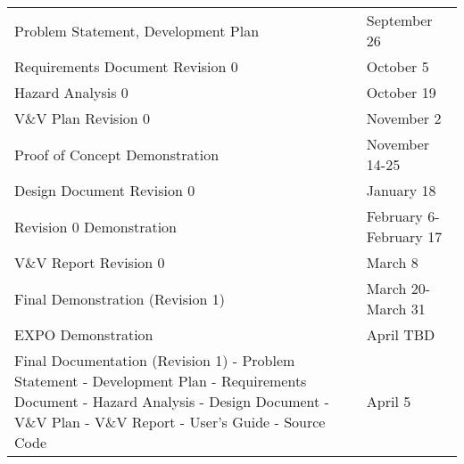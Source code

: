 \documentclass{article}
\begin{document}
\noindent \begin{tabular}{ p{6.7cm} l}
   Problem Statement, Development Plan & September 26 \\
   Requirements Document Revision 0 & October 5 \\
   Hazard Analysis 0 & October 19 \\
   V\&V Plan Revision 0 & November 2 \\
   Proof of Concept Demonstration & November 14-25 \\
   Design Document Revision 0 & January 18 \\
   Revision 0 Demonstration & February 6-February 17 \\
   V\&V Report Revision 0 & March 8 \\
   Final Demonstration (Revision 1) & March 20-March 31 \\
   EXPO Demonstration & April TBD \\
   Final Documentation (Revision 1)\newline 
    - Problem Statement\newline
    - Development Plan\newline
    - Requirements Document\newline
    - Hazard Analysis\newline
    - Design Document\newline
    - V\&V Plan\newline
    - V\&V Report\newline
    - User's Guide\newline
    - Source Code\newline &  April 5 \\
\end{tabular}
\end{document}

